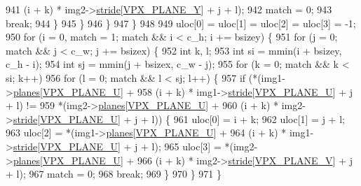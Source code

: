 \begin{DoxyCodeInclude}
{{{{{{{{{{{{{{{{{{{{{{{{{{{941                         (i + k) * img2->\hyperlink{structvpx__image_ac9c7b83e3eea44cb680956f90dc789cf}{stride}[\hyperlink{vpx__image_8h_a08171c4636c655e1ab0b76e06219f9e2}{VPX\_PLANE\_Y}] + j + l);
942             match = 0;
943             \textcolor{keywordflow}{break};
944           \}
945         \}
946     \}
947   \}
948 
949   uloc[0] = uloc[1] = uloc[2] = uloc[3] = -1;
950   \textcolor{keywordflow}{for} (i = 0, match = 1; match && i < c\_h; i += bsizey) \{
951     \textcolor{keywordflow}{for} (j = 0; match && j < c\_w; j += bsizex) \{
952       \textcolor{keywordtype}{int} k, l;
953       \textcolor{keywordtype}{int} si = mmin(i + bsizey, c\_h - i);
954       \textcolor{keywordtype}{int} sj = mmin(j + bsizex, c\_w - j);
955       \textcolor{keywordflow}{for} (k = 0; match && k < si; k++)
956         \textcolor{keywordflow}{for} (l = 0; match && l < sj; l++) \{
957           \textcolor{keywordflow}{if} (*(img1->\hyperlink{structvpx__image_ab6258308ba7a5f4a113348120e20e2ce}{planes}[\hyperlink{vpx__image_8h_a4770fc8fa60021a2229f25553152cf81}{VPX\_PLANE\_U}] +
958                 (i + k) * img1->\hyperlink{structvpx__image_ac9c7b83e3eea44cb680956f90dc789cf}{stride}[\hyperlink{vpx__image_8h_a4770fc8fa60021a2229f25553152cf81}{VPX\_PLANE\_U}] + j + l) !=
959               *(img2->\hyperlink{structvpx__image_ab6258308ba7a5f4a113348120e20e2ce}{planes}[\hyperlink{vpx__image_8h_a4770fc8fa60021a2229f25553152cf81}{VPX\_PLANE\_U}] +
960                 (i + k) * img2->\hyperlink{structvpx__image_ac9c7b83e3eea44cb680956f90dc789cf}{stride}[\hyperlink{vpx__image_8h_a4770fc8fa60021a2229f25553152cf81}{VPX\_PLANE\_U}] + j + l)) \{
961             uloc[0] = i + k;
962             uloc[1] = j + l;
963             uloc[2] = *(img1->\hyperlink{structvpx__image_ab6258308ba7a5f4a113348120e20e2ce}{planes}[\hyperlink{vpx__image_8h_a4770fc8fa60021a2229f25553152cf81}{VPX\_PLANE\_U}] +
964                         (i + k) * img1->\hyperlink{structvpx__image_ac9c7b83e3eea44cb680956f90dc789cf}{stride}[\hyperlink{vpx__image_8h_a4770fc8fa60021a2229f25553152cf81}{VPX\_PLANE\_U}] + j + l);
965             uloc[3] = *(img2->\hyperlink{structvpx__image_ab6258308ba7a5f4a113348120e20e2ce}{planes}[\hyperlink{vpx__image_8h_a4770fc8fa60021a2229f25553152cf81}{VPX\_PLANE\_U}] +
966                         (i + k) * img2->\hyperlink{structvpx__image_ac9c7b83e3eea44cb680956f90dc789cf}{stride}[\hyperlink{vpx__image_8h_aca9436ec761457cc6d2e356e0ac2fd23}{VPX\_PLANE\_V}] + j + l);
967             match = 0;
968             \textcolor{keywordflow}{break};
969           \}
970         \}
971     \}
}}}}}}}}}}}}}}}}}}}}}}}}}}}
\end{DoxyCodeInclude}
